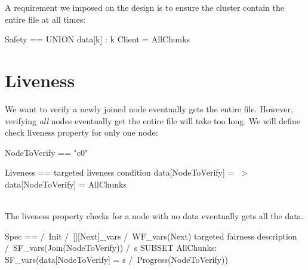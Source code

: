 A requirement we imposed on the design is to ensure the cluster contain the
entire file at all times:\\

\begin{tla}
Safety == 
    UNION {data[k] : k \in Client} = AllChunks
\end{tla}
\begin{tlatex}
%
\end{tlatex}

\section{Liveness}

We want to verify a newly joined node eventually gets the entire file. However, 
verifying \textit{all} nodes eventually get the entire file will take too long.
We will define check liveness property for only one node:\\

\begin{tla}
NodeToVerify == "c0"

Liveness == 
    \* targeted liveness condition
    data[NodeToVerify] = {} ~> data[NodeToVerify] = AllChunks
\end{tla}
\begin{tlatex}
%
\@pvspace{8.0pt}%
%
%
%
\@xx{}%
\end{tlatex}
\\

The liveness property checks for a node with no data eventually gets all the
data.\\

\begin{tla}
Spec ==
    /\ Init
    /\ [][Next]_vars
    /\ WF_vars(Next)
    \* targeted fairness description
    /\ SF_vars(Join(NodeToVerify))
    /\ \A s \in SUBSET AllChunks: 
        SF_vars(data[NodeToVerify] = s /\ Progress(NodeToVerify))   
\end{tla}
\begin{tlatex}
%
%
%
%
%
%
\@xx{}%
%
%
\end{tlatex}
\\

